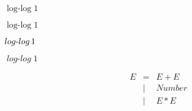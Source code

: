 \documentclass[11pt]{article}
\begin{document}

% 
% 

$\operatorname{log-log} 1$

$\mathit{\operatorname{log-log}} 1$

$\operatorname{\mathnormal{log-log}} 1$

$\operatorname{\mathit{log-log}} 1$

{\setlength{\arraycolsep}{0pt}
\[
\begin{array}{rcl}
E     &{} = {}& E + E \\
      &{} | {}& \textit{Number} \\
      &{} | {}& E * E
\end{array}
\]
}
\end{document}
